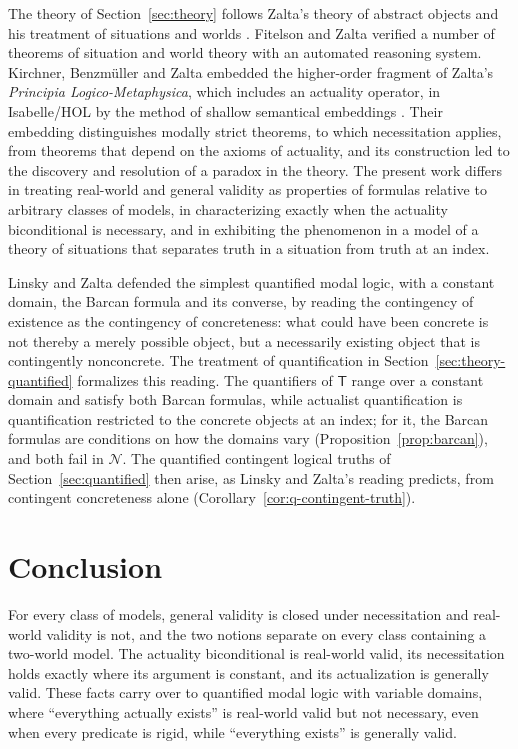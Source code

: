 \documentclass[11pt]{amsart}
\theoremstyle{plain}
\theoremstyle{definition}
\theoremstyle{remark}
\newcommand{\T}{\mathsf{T}}
\newcommand{\N}{\mathcal{N}}
\begin{document}
The theory of Section~\ref{sec:theory} follows Zalta's theory of
abstract objects \cite{zalta1983,zalta1988book} and his treatment of
situations and worlds \cite{zalta1993}. Fitelson and Zalta
\cite{fitelson2007} verified a number of theorems of situation and world
theory with an automated reasoning system. Kirchner, Benzm\"uller and
Zalta \cite{kirchner2019,kirchner2020} embedded the higher-order
fragment of Zalta's \emph{Principia Logico-Metaphysica}, which includes
an actuality operator, in Isabelle/HOL by the method of shallow
semantical embeddings \cite{benzmuller2013}. Their embedding
distinguishes modally strict theorems, to which necessitation applies,
from theorems that depend on the axioms of actuality, and its
construction led to the discovery and resolution of a paradox in the
theory. The present work differs in treating real-world and general
validity as properties of formulas relative to arbitrary classes of
models, in characterizing exactly when the actuality biconditional is
necessary, and in exhibiting the phenomenon in a model of a theory of
situations that separates truth in a situation from truth at an index.

Linsky and Zalta \cite{linsky1994} defended the simplest quantified
modal logic, with a constant domain, the Barcan formula and its
converse, by reading the contingency of existence as the contingency of
concreteness: what could have been concrete is not thereby a merely
possible object, but a necessarily existing object that is contingently
nonconcrete. The treatment of quantification in
Section~\ref{sec:theory-quantified} formalizes this reading. The
quantifiers of $\T$ range over a constant domain and satisfy both
Barcan formulas, while actualist quantification is quantification
restricted to the concrete objects at an index; for it, the Barcan
formulas are conditions on how the domains vary
(Proposition~\ref{prop:barcan}), and both fail in $\N$. The quantified
contingent logical truths of Section~\ref{sec:quantified} then arise,
as Linsky and Zalta's reading predicts, from contingent concreteness
alone (Corollary~\ref{cor:q-contingent-truth}).

\section{Conclusion}
\label{sec:conclusion}

For every class of models, general validity is closed under
necessitation and real-world validity is not, and the two notions
separate on every class containing a two-world model. The actuality
biconditional is real-world valid, its necessitation holds exactly
where its argument is constant, and its actualization is generally
valid. These facts carry over to quantified modal logic with variable
domains, where ``everything actually exists'' is real-world valid but
not necessary, even when every predicate is rigid, while ``everything
exists'' is generally valid.
\end{document}
